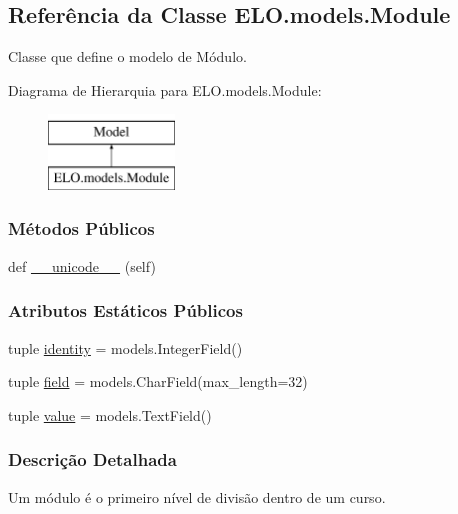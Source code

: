 \hypertarget{classELO_1_1models_1_1Module}{}\subsection{Referência da Classe E\+L\+O.\+models.\+Module}
\label{classELO_1_1models_1_1Module}


Classe que define o modelo de Módulo.  


Diagrama de Hierarquia para E\+L\+O.\+models.\+Module\+:\begin{figure}[H]
\begin{center}
\leavevmode
\includegraphics[height=2.000000cm]{d1/d5d/classELO_1_1models_1_1Module}
\end{center}
\end{figure}
\subsubsection*{Métodos Públicos}
\begin{DoxyCompactItemize}
\item 
def \hyperlink{classELO_1_1models_1_1Module_a8fc9fadf09fa7b3bbcfea69ebe25d278}{\+\_\+\+\_\+unicode\+\_\+\+\_\+} (self)
\end{DoxyCompactItemize}
\subsubsection*{Atributos Estáticos Públicos}
\begin{DoxyCompactItemize}
\item 
tuple \hyperlink{classELO_1_1models_1_1Module_abbf09409159a27a42ea6cb33fcc7fde7}{identity} = models.\+Integer\+Field()
\item 
tuple \hyperlink{classELO_1_1models_1_1Module_ad05ba106a7012cd72877fe21e8639e2d}{field} = models.\+Char\+Field(max\+\_\+length=32)
\item 
tuple \hyperlink{classELO_1_1models_1_1Module_a5b31cea93dea5474f3ff974cd745e39f}{value} = models.\+Text\+Field()
\end{DoxyCompactItemize}


\subsubsection{Descrição Detalhada}
Um módulo é o primeiro nível de divisão dentro de um curso.

